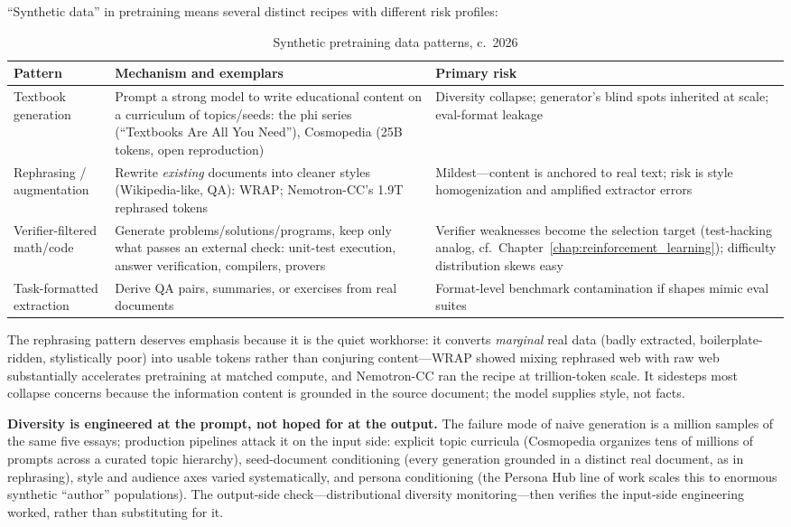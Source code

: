 ``Synthetic data'' in pretraining means several distinct recipes with different risk profiles:

\begin{table}[H]
\centering
\small
\caption{Synthetic pretraining data patterns, c.~2026}
\label{tab:pretrain_synthetic}
\begin{tabularx}{\textwidth}{lXX}
\toprule
\textbf{Pattern} & \textbf{Mechanism and exemplars} & \textbf{Primary risk} \\
\midrule
Textbook generation & Prompt a strong model to write educational content on a curriculum of topics/seeds: the phi series (``Textbooks Are All You Need''), Cosmopedia (25B tokens, open reproduction) & Diversity collapse; generator's blind spots inherited at scale; eval-format leakage \\
Rephrasing / augmentation & Rewrite \textit{existing} documents into cleaner styles (Wikipedia-like, QA): WRAP; Nemotron-CC's 1.9T rephrased tokens & Mildest---content is anchored to real text; risk is style homogenization and amplified extractor errors \\
Verifier-filtered math/code & Generate problems/solutions/programs, keep only what passes an external check: unit-test execution, answer verification, compilers, provers & Verifier weaknesses become the selection target (test-hacking analog, cf.\ Chapter~\ref{chap:reinforcement_learning}); difficulty distribution skews easy \\
Task-formatted extraction & Derive QA pairs, summaries, or exercises from real documents & Format-level benchmark contamination if shapes mimic eval suites \\
\bottomrule
\end{tabularx}
\end{table}

The rephrasing pattern deserves emphasis because it is the quiet workhorse: it converts \textit{marginal} real data (badly extracted, boilerplate-ridden, stylistically poor) into usable tokens rather than conjuring content---WRAP showed mixing rephrased web with raw web substantially accelerates pretraining at matched compute, and Nemotron-CC ran the recipe at trillion-token scale. It sidesteps most collapse concerns because the information content is grounded in the source document; the model supplies style, not facts.

\textbf{Diversity is engineered at the prompt, not hoped for at the output.} The failure mode of naive generation is a million samples of the same five essays; production pipelines attack it on the input side: explicit topic curricula (Cosmopedia organizes tens of millions of prompts across a curated topic hierarchy), seed-document conditioning (every generation grounded in a distinct real document, as in rephrasing), style and audience axes varied systematically, and persona conditioning (the Persona Hub line of work scales this to enormous synthetic ``author'' populations). The output-side check---distributional diversity monitoring---then verifies the input-side engineering worked, rather than substituting for it.

